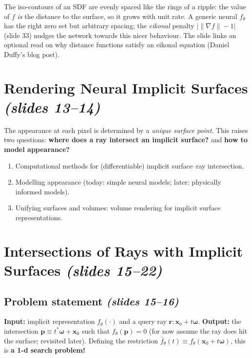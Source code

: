 \documentclass[11pt,a4paper]{article}
\newcommand{\bx}{\bm{x}}
\newcommand{\bp}{{\bm{p}}}
\newcommand{\bom}{{\bm{\omega}}}
\newcommand{\br}{{\bm{r}}}
\theoremstyle{definition}
\theoremstyle{plain}
\theoremstyle{remark}
\begin{document}
\begin{intuition}
The iso-contours of an SDF are evenly spaced like the rings of a ripple: the value of $f$ \emph{is} the distance to
the surface, so it grows with unit rate. A generic neural $f_\theta$ has the right zero set but arbitrary spacing; the
\emph{eikonal} penalty $\bigl|\|\nabla f\|-1\bigr|$ (slide 33) nudges the network towards this nicer behaviour.
The slide links an optional read on why distance functions satisfy an eikonal equation (Daniel Duffy's blog post).
\end{intuition}

\section{Rendering Neural Implicit Surfaces \emph{(slides 13--14)}}
The appearance at each pixel is determined by a \emph{unique surface point}. This raises two questions:
\textbf{where does a ray intersect an implicit surface?} and \textbf{how to model appearance?}

\begin{tcolorbox}[colback=white,colframe=black!60,title=Today's goals (slide 14)]
\begin{enumerate}[nosep,leftmargin=1.2em]
\item Computational methods for (differentiable) implicit surface--ray intersection.
\item Modelling appearance (today: simple neural models; later: physically informed models).
\item Unifying surfaces and volumes: volume rendering for implicit surface representations.
\end{enumerate}
\end{tcolorbox}

\section{Intersections of Rays with Implicit Surfaces \emph{(slides 15--22)}}
\subsection{Problem statement \emph{(slides 15--16)}}
\textbf{Input:} implicit representation $f_\theta(\cdot)$ and a query ray $\br:\bx_0+t\bom$.
\textbf{Output:} the intersection $\bp\equiv t^*\bom+\bx_0$ such that $f_\theta(\bp)=0$ (for now assume the ray
does hit the surface; revisited later).
Defining the restriction $\bar f_\theta(t)\equiv f_\theta(\bx_0+t\bom)$, this is \textbf{a 1-d search problem!}
\end{document}
